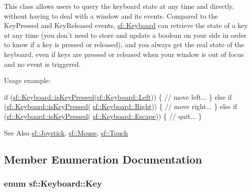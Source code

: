 This class allows users to query the keyboard state at any time and directly, without having to deal with a window and its events. Compared to the Key\-Pressed and Key\-Released events, \hyperlink{classsf_1_1_keyboard}{sf\-::\-Keyboard} can retrieve the state of a key at any time (you don't need to store and update a boolean on your side in order to know if a key is pressed or released), and you always get the real state of the keyboard, even if keys are pressed or released when your window is out of focus and no event is triggered.

Usage example\-: 
\begin{DoxyCode}
\textcolor{keywordflow}{if} (\hyperlink{classsf_1_1_keyboard_a80a04b2f53005886957f49eee3531599}{sf::Keyboard::isKeyPressed}(\hyperlink{classsf_1_1_keyboard_acb4cacd7cc5802dec45724cf3314a142a5e7dd0a44aba7c8ca5cde717af892507}{sf::Keyboard::Left}))
\{
    \textcolor{comment}{// move left...}
\}
\textcolor{keywordflow}{else} \textcolor{keywordflow}{if} (\hyperlink{classsf_1_1_keyboard_a80a04b2f53005886957f49eee3531599}{sf::Keyboard::isKeyPressed}(
      \hyperlink{classsf_1_1_keyboard_acb4cacd7cc5802dec45724cf3314a142a30e643d209ea070c73ca1b5602e10ff4}{sf::Keyboard::Right}))
\{
    \textcolor{comment}{// move right...}
\}
\textcolor{keywordflow}{else} \textcolor{keywordflow}{if} (\hyperlink{classsf_1_1_keyboard_a80a04b2f53005886957f49eee3531599}{sf::Keyboard::isKeyPressed}(
      \hyperlink{classsf_1_1_keyboard_acb4cacd7cc5802dec45724cf3314a142a72019ff9ecb145a9d3910177a49c757a}{sf::Keyboard::Escape}))
\{
    \textcolor{comment}{// quit...}
\}
\end{DoxyCode}


\begin{DoxySeeAlso}{See Also}
\hyperlink{classsf_1_1_joystick}{sf\-::\-Joystick}, \hyperlink{classsf_1_1_mouse}{sf\-::\-Mouse}, \hyperlink{classsf_1_1_touch}{sf\-::\-Touch} 
\end{DoxySeeAlso}


\subsection{Member Enumeration Documentation}
\hypertarget{classsf_1_1_keyboard_acb4cacd7cc5802dec45724cf3314a142}{
\subsubsection[{Key}]{\setlength{\rightskip}{0pt plus 5cm}enum {\bf sf\-::\-Keyboard\-::\-Key}}}\label{classsf_1_1_keyboard_acb4cacd7cc5802dec45724cf3314a142}


